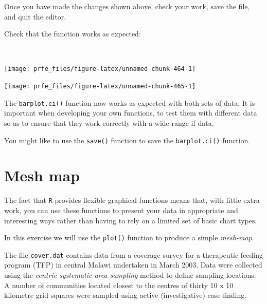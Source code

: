\documentclass[12pt,a4paper]{book}
\newenvironment{Shaded}{\begin{snugshade}}{\end{snugshade}}
\newcommand{\KeywordTok}[1]{\textcolor[rgb]{0.13,0.29,0.53}{\textbf{#1}}}
\newcommand{\OperatorTok}[1]{\textcolor[rgb]{0.81,0.36,0.00}{\textbf{#1}}}
\newcommand{\NormalTok}[1]{#1}
\theoremstyle{definition}
\theoremstyle{definition}
\theoremstyle{definition}
\theoremstyle{remark}
\begin{document}
\newpage

Once you have made the changes shown above, check your work, save the
file, and quit the editor.

Check that the function works as expected:

~

\begin{Shaded}
\end{Shaded}

\begin{center}\texttt{[image: prfe\_files/figure-latex/unnamed-chunk-464-1]} \end{center}

\begin{center}\texttt{[image: prfe\_files/figure-latex/unnamed-chunk-465-1]} \end{center}

\newpage

The \texttt{barplot.ci()} function now works as expected with both sets
of data. It is important when developing your own functions, to test
them with different data so as to ensure that they work correctly with a
wide range if data.

You might like to use the \texttt{save()} function to save the
\texttt{barplot.ci()} function.

\hypertarget{mesh-map}{%
\section{Mesh map}\label{mesh-map}}

The fact that \texttt{R} provides flexible graphical functions means
that, with little extra work, you can use these functions to present
your data in appropriate and interesting ways rather than having to rely
on a limited set of basic chart types.

In this exercise we will use the \texttt{plot()} function to produce a
simple \emph{mesh-map}.

The file \texttt{cover.dat} contains data from a coverage survey for a
therapeutic feeding program (TFP) in central Malawi undertaken in March
2003. Data were collected using the \emph{centric systematic area
sampling} method to define sampling locations: A number of communities
located closest to the centres of thirty 10 x 10 kilometre grid squares
were sampled using active (investigative) case-finding.
\end{document}
